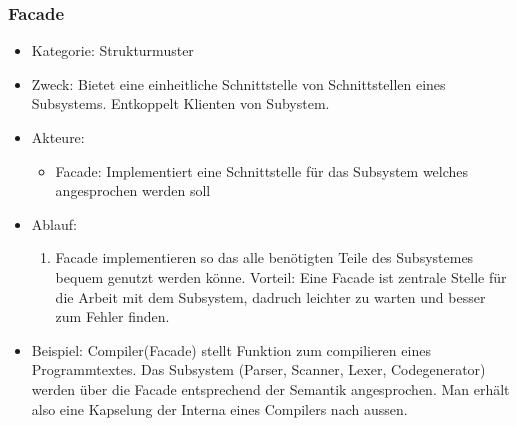 \documentclass[11pt, fleqn, a4paper, leqno]{scrartcl} %
\begin{document}
		\subsubsection{Facade}
			\begin{itemize}
				\item Kategorie: Strukturmuster
				\item Zweck: Bietet eine einheitliche Schnittstelle von Schnittstellen eines Subsystems. Entkoppelt Klienten von Subystem.
				\item Akteure: 
					\begin{itemize}
						\item Facade: Implementiert eine Schnittstelle für das Subsystem welches angesprochen werden soll
					\end{itemize}
				\item Ablauf:
					\begin{enumerate}
						\item Facade implementieren so das alle benötigten Teile des Subsystemes bequem genutzt werden könne. Vorteil: Eine Facade ist zentrale Stelle für die Arbeit mit dem Subsystem, dadruch leichter zu warten und besser zum Fehler finden.
					\end{enumerate}
				\item Beispiel: Compiler(Facade) stellt Funktion zum compilieren eines Programmtextes. Das Subsystem (Parser, Scanner, Lexer, Codegenerator) werden über die Facade entsprechend der Semantik angesprochen. Man erhält also eine Kapselung der Interna eines Compilers nach aussen. 
			\end{itemize}
\end{document}
